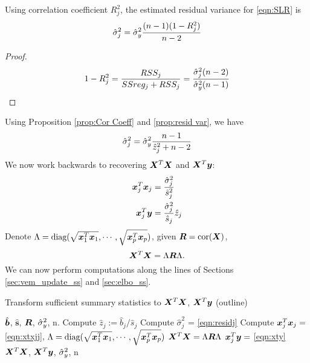 \begin{proposition} \label{prop:resid var}
Using correlation coefficient $R^2_j$, the estimated residual variance for \eqref{eqn:SLR} is
\begin{equation}
    \hat{\sigma}_{j}^2 = \hat{\sigma}_y^2\frac{(n-1)(1-R_{j}^2)}{n-2} \label{eqn:sigma2hat}
\end{equation}
\end{proposition}
\begin{proof}
\begin{equation}
    1-R_{j}^{2} = \frac{RSS_j}{SSreg_j + RSS_j} = \frac{\hat{\sigma}_{j}^2(n-2)}{\hat{\sigma}_y^2(n-1)}
\end{equation}
\end{proof}
Using Proposition \ref{prop:Cor Coeff} and \ref{prop:resid var}, we have 
\begin{equation}\label{eqn:residj}
    \hat{\sigma}_{j}^2 = \hat{\sigma}_y^2 \frac{n-1}{\hat{z}_{j}^2+n-2}
\end{equation}
We now work backwards to recovering $\bm X^T\bm X$ and $\bm X^T\bm y$:
\begin{align}
    \bm x_j^{T}\bm x_j &= \frac{\hat{\sigma}_{j}^2}{\hat{s}_{j}^{2}} \label{eqn:xtxjj} \\
    \bm x_j^{T}\bm y &= \frac{\hat{\sigma}_{j}^2}{\hat{s}_{j}} \hat{z}_{j} \label{eqn:xty}
\end{align}
Denote $\Lambda = \text{diag}(\sqrt{\bm x_1^{T}\bm x_1}, \cdots, \sqrt{\bm x_p^{T}\bm x_p})$, given $\bm R = \text{cor}(\bm X)$,
\begin{equation}\label{eqn:xtx}
    \bm X^T \bm X = \Lambda \bm R \Lambda.
\end{equation}
We can now perform \susie computations along the lines of Sections \ref{sec:vem_update_ss} and \ref{sec:elbo_ss}.

\begin{algorithm}[H] 
\caption{Transform sufficient summary statistics to $\bm X^T \bm X$, $\bm X^T \bm y$ (outline)} \label{alg:ss suff interface}
\begin{algorithmic}[1]
\Require $\hat{\bm b}$, $\hat{\bm{s}}$, $\bm R$, $\hat{\sigma}_y^2$, n.
\State Compute $\hat{z}_j := \hat{b}_{j} / \hat{s}_j $
\State Compute $\hat{\sigma}_{j}^2$ = \eqref{eqn:residj}
\State Compute $\bm x_j^{T}\bm x_j = $ \eqref{eqn:xtxjj}, $\Lambda = \text{diag}(\sqrt{\bm x_1^{T}\bm x_1}, \cdots, \sqrt{\bm x_p^{T}\bm x_p})$
\State $\bm X^T \bm X = \Lambda \bm R \Lambda$
\State $\bm x_j^{T}\bm y = $ \eqref{eqn:xty} \\
\Return $\bm X^T \bm X$, $\bm X^{T}\bm y$, $\hat{\sigma}_y^2$, n
\end{algorithmic}
\end{algorithm}


